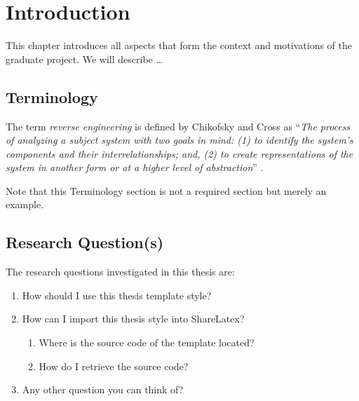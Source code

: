\chapter{\label{cha:intro}Introduction}

This chapter introduces all aspects that form the context and
motivations of the graduate project. We will describe \ldots

\section{Terminology}

The term \emph{reverse engineering} is defined by Chikofsky and Cross as
``\emph{The process of analyzing a subject system with two goals in mind:
(1) to identify the system's components and their interrelationships; and,
(2) to create representations of the system in another form or at a higher
level of abstraction}'' \cite{CC90}.

Note that this Terminology section is not a required section but
merely an example.

\section{Research Question(s)}

The research questions investigated in this thesis are:

\begin{enumerate}[label=\textbf{RQ\arabic*}]
\item How should I use this thesis template style?
\item How can I import this thesis style into ShareLatex?
\begin{enumerate}[label*=\textbf{.\arabic*}]
\item Where is the source code of the template located?
\item How do I retrieve the source code?
\end{enumerate}
\item Any other question you can think of?
\end{enumerate}


